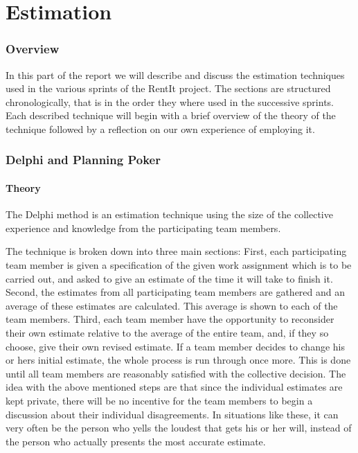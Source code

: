 \part{Estimation}
\section{Overview}
In this part of the report we will describe and discuss the estimation techniques used in the various sprints of the RentIt project. The sections are structured chronologically, that is in the order they where used in the successive sprints. Each described technique will begin with a brief overview of the theory of the technique followed by a reflection on our own experience of employing it.

\section{Delphi and Planning Poker}

\subsection{Theory}

The Delphi method is an estimation technique using the size of the collective experience and knowledge from the participating team members.

The technique is broken down into three main sections:
First, each participating team member is given a specification of the given work assignment which is to be carried out, and asked to give an estimate of the time it will take to finish it.
Second, the estimates from all participating team members are gathered and an average of these estimates are calculated. This average is shown to each of the team members.
Third, each team member have the opportunity to reconsider their own estimate relative to the average of the entire team, and, if they so choose, give their own revised estimate.
If a team member decides to change his or hers initial estimate, the whole process is run through once more. This is done until all team members are reasonably satisfied with the collective decision. 
The idea with the above mentioned steps are that since the individual estimates are kept private, there will be no incentive for the team members to begin a discussion about their individual disagreements. In situations like these, it can very often be the person who yells the loudest that gets his or her will, instead of the person who actually presents the most accurate estimate.


